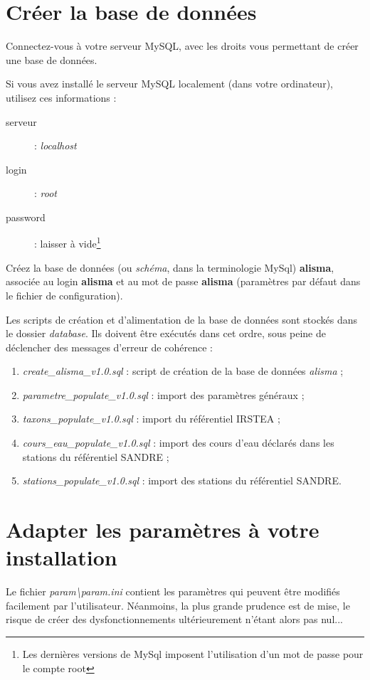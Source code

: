 \section{Créer la base de données}
Connectez-vous à votre serveur MySQL, avec les droits vous permettant de créer une base de données.

Si vous avez installé le serveur MySQL localement (dans votre ordinateur), utilisez ces informations :
\begin{description}
\item[serveur] : \textit{localhost}
\item[login] : \textit{root}
\item[password] : laisser à vide\footnote{Les dernières versions de MySql imposent l'utilisation d'un mot de passe pour le compte root}
\end{description}

Créez la base de données (ou \textit{schéma}, dans la terminologie MySql) \textbf{alisma}, associée au login \textbf{alisma} et au mot de passe \textbf{alisma} (paramètres par défaut dans le fichier de configuration).

Les scripts de création et d'alimentation de la base de données sont stockés dans le dossier \textit{database}. Ils doivent être exécutés dans cet ordre, sous peine de déclencher des messages d'erreur de cohérence :
\begin{enumerate}
\item \textit{create\_alisma\_v1.0.sql} : script de création de la base de données \textit{alisma} ;
\item \textit{parametre\_populate\_v1.0.sql} : import des paramètres généraux ;
\item \textit{taxons\_populate\_v1.0.sql} : import du référentiel IRSTEA ;
\item \textit{cours\_eau\_populate\_v1.0.sql} : import des cours d'eau déclarés dans les stations du référentiel SANDRE ;
\item \textit{stations\_populate\_v1.0.sql} : import des stations du référentiel SANDRE.
\end{enumerate}

\section{Adapter les paramètres à votre installation}
\label{sec:param}
Le fichier \textit{param\textbackslash{}param.ini} contient les paramètres qui peuvent être modifiés facilement par l'utilisateur. Néanmoins, la plus grande prudence est de mise, le risque de créer des dysfonctionnements ultérieurement n'étant alors pas nul...

